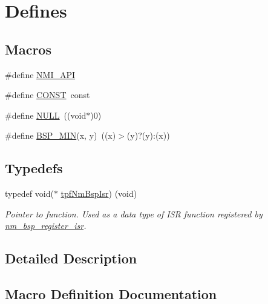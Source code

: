 \hypertarget{group__BSPDefine}{}\section{Defines}
\label{group__BSPDefine}
\subsection*{Macros}
\begin{DoxyCompactItemize}
\item 
\#define \hyperlink{group__BSPDefine_gaecc0323d771e41ef81a76b5f12783e22}{N\+M\+I\+\_\+\+A\+PI}
\item 
\#define \hyperlink{group__BSPDefine_ga0c33b494a68ce28497e7ce8e5e95feff}{C\+O\+N\+ST}~const
\item 
\#define \hyperlink{group__BSPDefine_ga070d2ce7b6bb7e5c05602aa8c308d0c4}{N\+U\+LL}~((void$\ast$)0)
\item 
\#define \hyperlink{group__BSPDefine_ga53cd5682e7a3c1a3a9ec1baa8d5c29e2}{B\+S\+P\+\_\+\+M\+IN}(x,  y)~((x)$>$(y)?(y)\+:(x))
\end{DoxyCompactItemize}
\subsection*{Typedefs}
\begin{DoxyCompactItemize}
\item 
typedef void($\ast$ \hyperlink{group__BSPDefine_gab061a1639662a3114b4c8b3b39bd6848}{tpf\+Nm\+Bsp\+Isr}) (void)
\begin{DoxyCompactList}\small\item\em Pointer to function. Used as a data type of I\+SR function registered by \hyperlink{group__NmBspRegisterFn_ga1b42af0f91da07772d2d5c871c9c3e62}{nm\+\_\+bsp\+\_\+register\+\_\+isr}. \end{DoxyCompactList}\end{DoxyCompactItemize}


\subsection{Detailed Description}


\subsection{Macro Definition Documentation}
\mbox{\label{group__BSPDefine_ga53cd5682e7a3c1a3a9ec1baa8d5c29e2}} 
